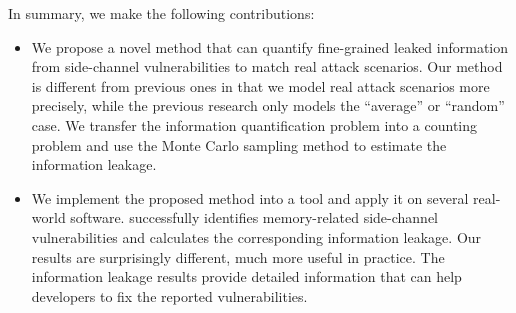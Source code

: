 In summary, we make the following contributions:

\begin{itemize}
      \item We propose a novel method that can quantify fine-grained leaked
            information from side-channel vulnerabilities to match real attack
            scenarios. Our method is different from previous ones in that we
            model real attack scenarios more precisely, while the previous
            research only models the ``average'' or ``random'' case. 
            We transfer the information quantification problem into a counting
            problem and use the Monte Carlo sampling method to estimate the
            information leakage.
   
      \item We implement the proposed method into a tool and apply it
            on several real-world software. \tool{} successfully identifies
            memory-related side-channel vulnerabilities and calculates the
            corresponding information leakage. 
            Our results are surprisingly different, much more useful in practice.
            The information leakage results
            provide detailed information that can help developers to fix the
            reported vulnerabilities.
\end{itemize}
